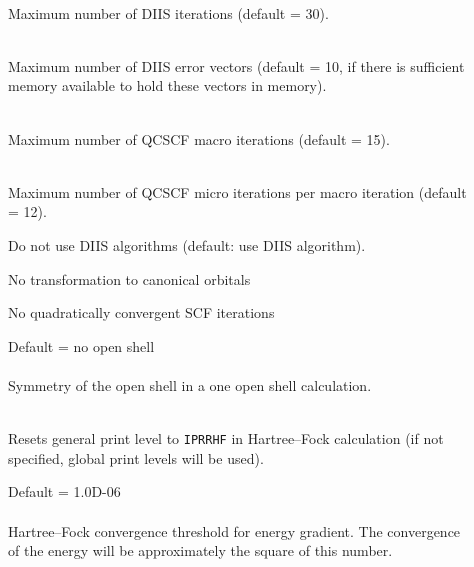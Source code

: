 \begin{description}
\item[]
   \\
  Maximum number of DIIS iterations (default = 30).

\item[]
   \\
  Maximum number of DIIS error vectors
  (default = 10, if there is sufficient memory available to hold these
  vectors in memory).

\item[]
   \\
  Maximum number of QCSCF macro iterations (default = 15).

\item[]
   \\
  Maximum number of QCSCF micro iterations per macro iteration (default = 12).

\item[]
  Do not use DIIS algorithms (default: use DIIS algorithm).

\item[]
  No transformation to canonical orbitals

\item[]
  No quadratically convergent SCF iterations

\item[]
  Default = no open shell\\
   \\
  Symmetry of the open shell in a one open shell
  calculation.

\item[]
   \\
  Resets general print level to \verb|IPRRHF| in Hartree--Fock calculation
  (if not specified, global print levels will be used).

\item[]
  Default = 1.0D-06\\
   \\
  Hartree--Fock convergence threshold for energy gradient.  The convergence
  of the energy will be approximately the square of this number.

\end{description}



